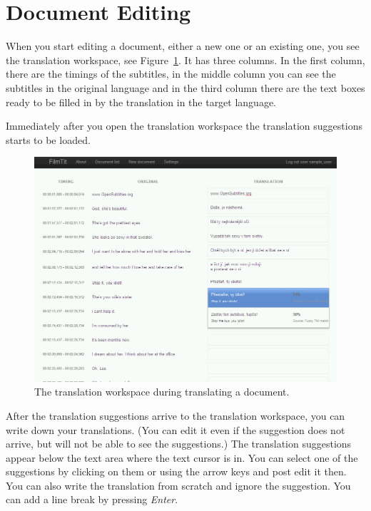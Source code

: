 \section{Document Editing}
\label{sec:document_editing}

When you start editing a document, either a new one or an existing one, you see the translation workspace, see Figure~\ref{fig:translation_workspace}. It has three columns. In the first column, there are the timings of the subtitles, in the middle column you can see the subtitles in the original language and in the third column there are the text boxes ready to be filled in by the translation in the target language.

Immediately after you open the translation workspace the translation suggestions starts to be loaded.

\begin{figure}[h]
\begin{center}
\includegraphics[scale=0.4]{figures/user_manual/translation_workspace.png}
\end{center}
\caption{The translation workspace during translating a document.}
\label{fig:translation_workspace}
\end{figure}

After the translation suggestions arrive to the translation workspace, you can write down your translations.  (You can edit it even if the suggestion does not arrive, but will not be able to see the suggestions.) The translation suggestions appear below the text area where the text cursor is in. You can select one of the suggestions by clicking on them or using the arrow keys and post edit it then. You can also write the translation from scratch and ignore the suggestion. You can add a line break by pressing \emph{Enter}.

